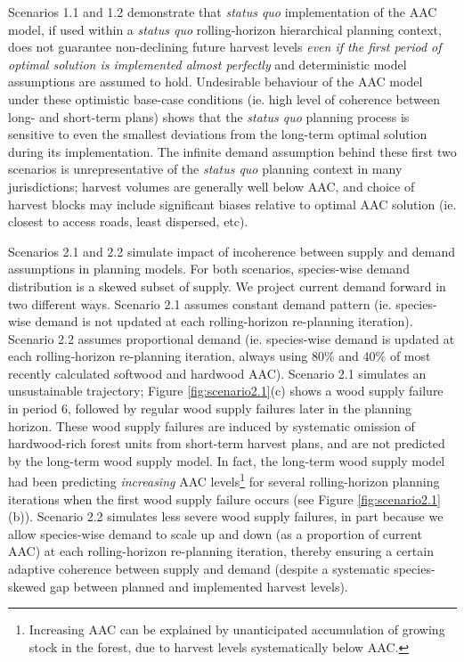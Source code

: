 Scenarios 1.1 and 1.2 demonstrate that \emph{status quo} implementation of
the AAC model, if used within a \emph{status quo} rolling-horizon
hierarchical planning context, does not guarantee non-declining future
harvest levels \emph{even if the first period of optimal solution is
  implemented almost perfectly} and deterministic model assumptions
are assumed to hold. Undesirable behaviour of the AAC model under
these optimistic base-case conditions (ie. high level of coherence
between long- and short-term plans) shows that the \emph{status quo} planning
process is sensitive to even the smallest deviations from the
long-term optimal solution during its implementation. The infinite
demand assumption behind these first two scenarios is unrepresentative
of the \emph{status quo} planning context in many jurisdictions; harvest volumes
are generally well below AAC, and choice of harvest blocks may
include significant biases relative to optimal AAC solution
(ie. closest to access roads, least dispersed, etc).

Scenarios 2.1 and 2.2 simulate impact of incoherence between supply
and demand assumptions in planning models. For both scenarios,
species-wise demand distribution is a skewed subset of supply. We
project current demand forward in two different ways. Scenario 2.1
assumes constant demand pattern (ie. species-wise demand is not updated
at each rolling-horizon re-planning iteration). Scenario 2.2 assumes
proportional demand (ie. species-wise demand is updated at each
rolling-horizon re-planning iteration, always using 80\% and 40\% of
most recently calculated softwood and hardwood AAC). Scenario 2.1
simulates an unsustainable trajectory; Figure \ref{fig:scenario2.1}(c)
shows a wood supply failure in period 6, followed by regular wood
supply failures later in the planning horizon. These wood supply
failures are induced by systematic omission of hardwood-rich forest
units from short-term harvest plans, and are not predicted by the
long-term wood supply model. In fact, the long-term wood supply model
had been predicting \emph{increasing} AAC levels\footnote{Increasing
  AAC can be explained by unanticipated accumulation of growing stock
  in the forest, due to harvest levels systematically below AAC.} for
several rolling-horizon planning iterations when the first wood supply
failure occurs (see Figure \ref{fig:scenario2.1}(b)). Scenario 2.2
simulates less severe wood supply failures, in part because we allow
species-wise demand to scale up and down (as a proportion of current
AAC) at each rolling-horizon re-planning iteration, thereby ensuring
a certain adaptive coherence between supply and demand (despite
a systematic species-skewed gap between planned and implemented harvest levels).

